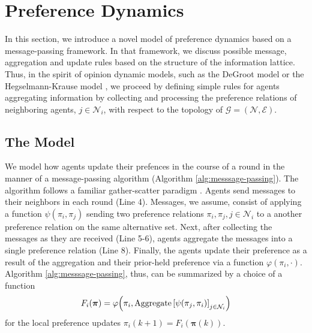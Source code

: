 \documentclass[conference]{ieeeconf}
\newcommand{\N}{\mathcal{N}}
\newcommand{\G}{\mathcal{G}}
\newcommand{\E}{\mathcal{E}}
\newcommand{\profile}{\boldsymbol{\pi}}
\DeclareMathOperator{\Aggregate}{Aggregate}
\begin{document}
\section{Preference Dynamics}
\label{sec:dynamics}

In this section, we introduce a novel model of preference dynamics based on a message-passing framework. In that framework, we discuss possible message, aggregation and update rules based on the structure of the information lattice. Thus, in the spirit of opinion dynamic models, such as the DeGroot model \cite{degroot1974} or the Hegselmann-Krause model \cite{hegselmann2002}, we proceed by defining simple rules for agents aggregating information by collecting and processing the preference relations of neighboring agents, $j \in \N_i$, with respect to the topology of $\G = (\N,\E)$.

\subsection{The Model}

We model how agents update their prefences in the course of a round in the manner of a message-passing algorithm (Algorithm \ref{alg:messsage-passing}). The algorithm follows a familiar gather-scatter paradigm \cite{dudzik}. Agents send messages to their neighbors in each round (Line 4). Messages, we assume, consist of applying a function $\psi(\pi_i,\pi_j)$ sending two preference relations $\pi_i, \pi_j, j \in \N_i$ to a another preference relation on the same alternative set.
Next, after collecting the messages as they are received (Line 5-6), agents aggregate the messages into a single preference relation (Line 8). Finally, the agents update their preference as a result of the aggregation and their prior-held preference via a function  $\varphi(\pi_i,\cdot)$. Algorithm \ref{alg:messsage-passing}, thus, can be summarized by a choice of a function
\begin{align}
    F_i(\profile) = \varphi\Bigl(\pi_i, \Aggregate{\left[ \psi(\pi_j, \pi_i)\right]_{j \in \N_i}} \Bigr) \label{eq:message-passing}
\end{align}
for the local preference updates $\pi_i(k+1) = F_i\left( \profile(k) \right)$.
\end{document}
